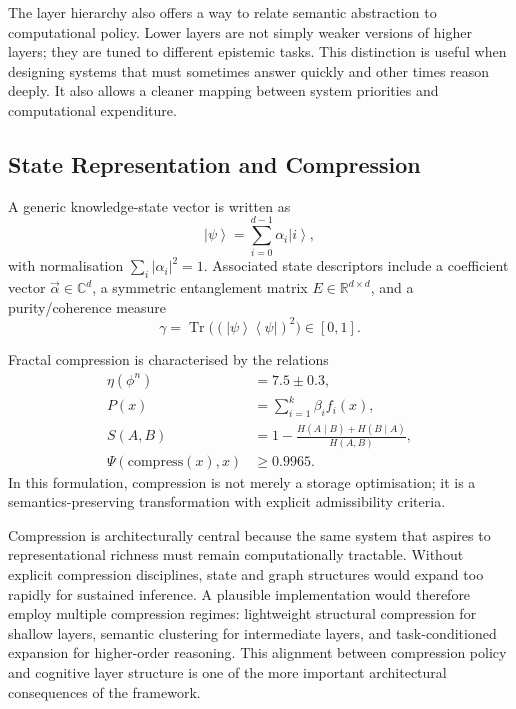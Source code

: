 \documentclass[12pt]{article}
\newcommand{\ket}[1]{\left|#1\right\rangle}
\newcommand{\bra}[1]{\left\langle#1\right|}
\newcommand{\Tr}{\operatorname{Tr}}
\begin{document}
The layer hierarchy also offers a way to relate semantic abstraction to computational policy. Lower layers are not simply weaker versions of higher layers; they are tuned to different epistemic tasks. This distinction is useful when designing systems that must sometimes answer quickly and other times reason deeply. It also allows a cleaner mapping between system priorities and computational expenditure.

\subsection{State Representation and Compression}
A generic knowledge-state vector is written as
\begin{equation}
\ket{\psi} = \sum_{i=0}^{d-1} \alpha_i \ket{i},
\end{equation}
with normalisation $\sum_i |\alpha_i|^2 = 1$. Associated state descriptors include a coefficient vector $\vec{\alpha} \in \mathbb{C}^d$, a symmetric entanglement matrix $E \in \mathbb{R}^{d\times d}$, and a purity/coherence measure
\begin{equation}
\gamma = \Tr\big((\ket{\psi}\bra{\psi})^2\big) \in [0,1].
\end{equation}

Fractal compression is characterised by the relations
\begin{align}
\eta(\phi^n) &= 7.5 \pm 0.3,\\
P(x) &= \sum_{i=1}^{k} \beta_i f_i(x),\\
S(A,B) &= 1 - \frac{H(A\mid B)+H(B\mid A)}{H(A,B)},\\
\Psi(\mathrm{compress}(x),x) &\ge 0.9965.
\end{align}
In this formulation, compression is not merely a storage optimisation; it is a semantics-preserving transformation with explicit admissibility criteria.

Compression is architecturally central because the same system that aspires to representational richness must remain computationally tractable. Without explicit compression disciplines, state and graph structures would expand too rapidly for sustained inference. A plausible implementation would therefore employ multiple compression regimes: lightweight structural compression for shallow layers, semantic clustering for intermediate layers, and task-conditioned expansion for higher-order reasoning. This alignment between compression policy and cognitive layer structure is one of the more important architectural consequences of the framework.
\end{document}
